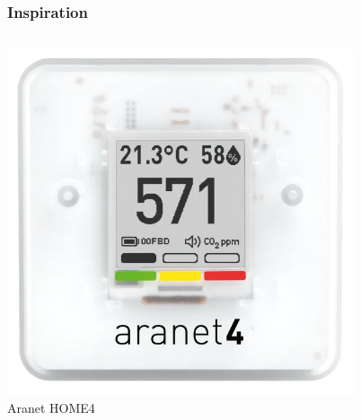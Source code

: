\documentclass[aspectratio=169,svgnames]{beamer}
\begin{document}
\begin{frame}
    \frametitle{Inspiration}
    \begin{columns}[c]
        \begin{column}{0.5\textwidth}
            \includegraphics[width=0.8\textwidth]{Aranet4.png}\\
            Aranet HOME4
        \end{column}        
        \begin{column}{0.5\textwidth}
        \end{column}
    \end{columns}
\end{frame}
\end{document}
